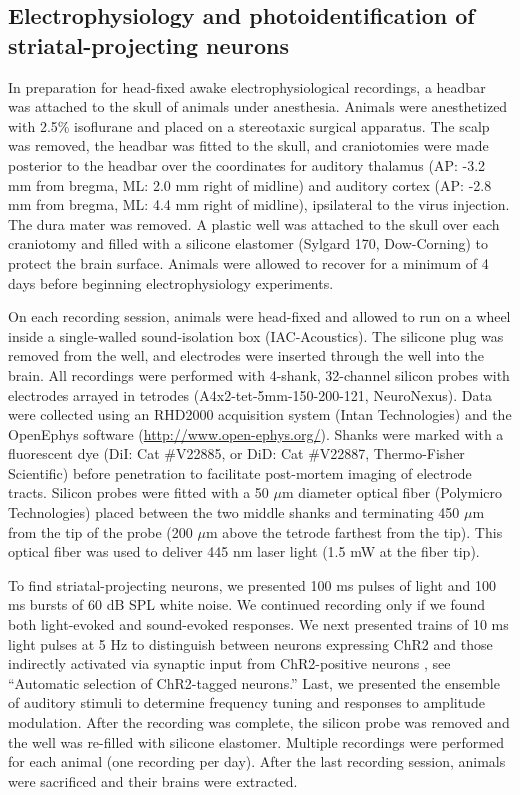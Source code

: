 \subsection{Electrophysiology and photoidentification of striatal-projecting neurons}
In preparation for head-fixed awake electrophysiological recordings, a headbar was attached to the skull of animals under anesthesia.
%
Animals were anesthetized with 2.5\% isoflurane and placed on a stereotaxic surgical apparatus. 
%
The scalp was removed, the headbar was fitted to the skull, and craniotomies were made posterior to the headbar over the coordinates for auditory thalamus (AP: -3.2 mm from bregma, ML: 2.0 mm right of midline) and auditory cortex (AP: -2.8 mm from bregma, ML: 4.4 mm right of midline), ipsilateral to the virus injection.
%
The dura mater was removed. 
%
A plastic well was attached to the skull over each craniotomy and filled with a silicone elastomer (Sylgard 170, Dow-Corning) to protect the brain surface. 
%
Animals were allowed to recover for a minimum of 4 days before beginning electrophysiology experiments.

On each recording session, animals were head-fixed and allowed to run on a wheel inside a single-walled sound-isolation box (IAC-Acoustics). 
%
The silicone plug was removed from the well, and electrodes were inserted through the well into the brain. 
%
All recordings were performed with 4-shank, 32-channel silicon probes with electrodes arrayed in tetrodes (A4x2-tet-5mm-150-200-121, NeuroNexus). 
%
Data were collected using an RHD2000 acquisition system (Intan Technologies) and the OpenEphys software (\url{http://www.open-ephys.org/}).
%
Shanks were marked with a fluorescent dye (DiI: Cat \#V22885, or DiD: Cat \#V22887, Thermo-Fisher Scientific) before penetration to facilitate post-mortem imaging of electrode tracts. 
%
Silicon probes were fitted with a 50 $\mu$m diameter optical fiber (Polymicro Technologies) placed between the two middle shanks and terminating 450 $\mu$m from the tip of the probe (200 $\mu$m above the tetrode farthest from the tip). 
%
This optical fiber was used to deliver 445 nm laser light (1.5 mW at the fiber tip).

To find striatal-projecting neurons, we presented 100 ms pulses of light and 100 ms bursts of 60 dB SPL white noise. 
%
We continued recording only if we found both light-evoked and sound-evoked responses. 
%
We next presented trains of 10 ms light pulses at 5 Hz to distinguish between neurons expressing ChR2 and those indirectly activated via synaptic input from ChR2-positive neurons \citep{Lima2009}, see ``Automatic selection of ChR2-tagged neurons.''
%
Last, we presented the ensemble of auditory stimuli to determine frequency tuning and responses to amplitude modulation. 
%
After the recording was complete, the silicon probe was removed and the well was re-filled with silicone elastomer. 
%
Multiple recordings were performed for each animal (one recording per day). 
%
After the last recording session, animals were sacrificed and their brains were extracted.

